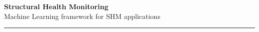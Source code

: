 \documentclass[12pt]{article}
\newcommand{\logosfolder}{logos/}
\begin{document}
 
\begin{titlepage}
 
    \thispagestyle{empty}
    
 
    \begin{center}
    
        {\Huge \textbf{Structural Health Monitoring}} \\[0.5cm] 
        Machine Learning framework for SHM applications \\[0.4cm]
        
        \noindent\rule{\textwidth}{0.4pt}\\[0.4cm]
 
        
        
        
        
 
    \end{center}
    
\end{titlepage}
 
\newpage
 
\end{document}
